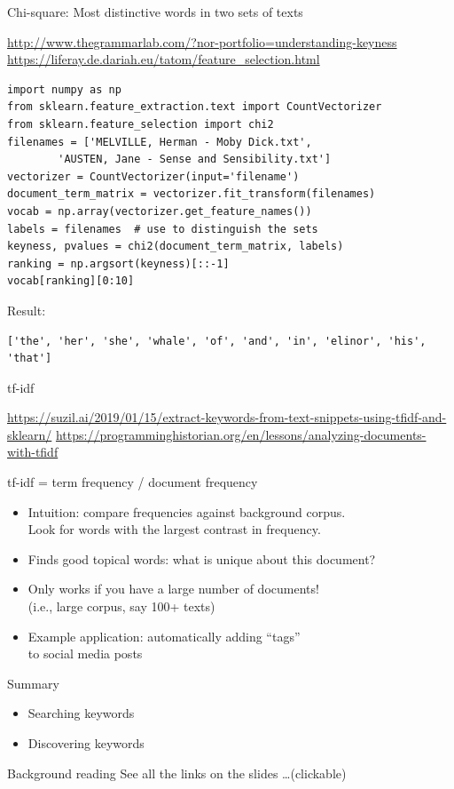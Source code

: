 \documentclass[aspectratio=169,usenames,dvipsnames]{beamer}
\begin{document}
\begin{frame}[fragile]{Chi-square: Most distinctive words in two sets of texts}
    \begin{reference}
        \url{http://www.thegrammarlab.com/?nor-portfolio=understanding-keyness} \\
        \url{https://liferay.de.dariah.eu/tatom/feature_selection.html}
    \end{reference}
\begin{lstlisting}
import numpy as np
from sklearn.feature_extraction.text import CountVectorizer
from sklearn.feature_selection import chi2
filenames = ['MELVILLE, Herman - Moby Dick.txt',
        'AUSTEN, Jane - Sense and Sensibility.txt']
vectorizer = CountVectorizer(input='filename')
document_term_matrix = vectorizer.fit_transform(filenames)
vocab = np.array(vectorizer.get_feature_names())
labels = filenames  # use to distinguish the sets
keyness, pvalues = chi2(document_term_matrix, labels)
ranking = np.argsort(keyness)[::-1]
vocab[ranking][0:10]
\end{lstlisting}
Result:
\begin{lstlisting}
['the', 'her', 'she', 'whale', 'of', 'and', 'in', 'elinor', 'his', 'that']
\end{lstlisting}
\end{frame}

\begin{frame}[fragile]{tf-idf}
\begin{reference}\scriptsize
    \url{https://suzil.ai/2019/01/15/extract-keywords-from-text-snippets-using-tfidf-and-sklearn/}
    \url{https://programminghistorian.org/en/lessons/analyzing-documents-with-tfidf}
\end{reference}
tf-idf = term frequency / document frequency

    \begin{itemize}
        \item Intuition: compare frequencies against background corpus.\\
            Look for words with the largest contrast in frequency.
        \item Finds good topical words: what is unique about this document?
        \item Only works if you have a large number of documents! \\
            (i.e., large corpus, say 100+ texts)
        \item Example application: automatically adding ``tags'' \\
            to social media posts
    \end{itemize}
\end{frame}

\begin{frame}{Summary}
    \begin{itemize}
        \item Searching keywords
        \item Discovering keywords
    \end{itemize}
\end{frame}

\begin{frame}{Background reading}
    See all the links on the slides \dots (clickable)
\end{frame}
\end{document}
